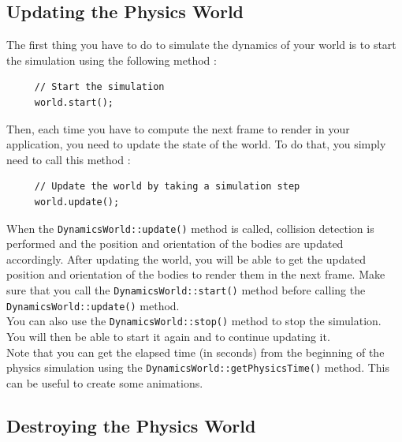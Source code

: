 \documentclass[a4paper,12pt]{article}
\begin{document}
    \subsection{Updating the Physics World}

    The first thing you have to do to simulate the dynamics of your world is to start the simulation using the following method : \\

    \begin{lstlisting}
     // Start the simulation
     world.start();
  \end{lstlisting}

    \vspace{0.6cm}

    Then, each time you have to compute the next frame to render in your application, you need to update the state of the world. To do that, you simply need to call this method : \\

    \begin{lstlisting}
     // Update the world by taking a simulation step
     world.update();
  \end{lstlisting}

    \vspace{0.6cm}

    When the \texttt{DynamicsWorld::update()} method is called, collision detection is performed and the position and orientation of the bodies are updated accordingly.
    After updating the world, you will be able to get the updated position and orientation of the bodies to render them in the next frame. Make sure that you call
    the \texttt{DynamicsWorld::start()} method before calling the \texttt{DynamicsWorld::update()} method. \\

    You can also use the \texttt{DynamicsWorld::stop()} method to stop the simulation. You will then be able to start it again and to continue updating it. \\

    Note that you can get the elapsed time (in seconds) from the beginning of the physics simulation using the \texttt{DynamicsWorld::getPhysicsTime()} method. This can be useful to
    create some animations.

    \subsection{Destroying the Physics World}
\end{document}

